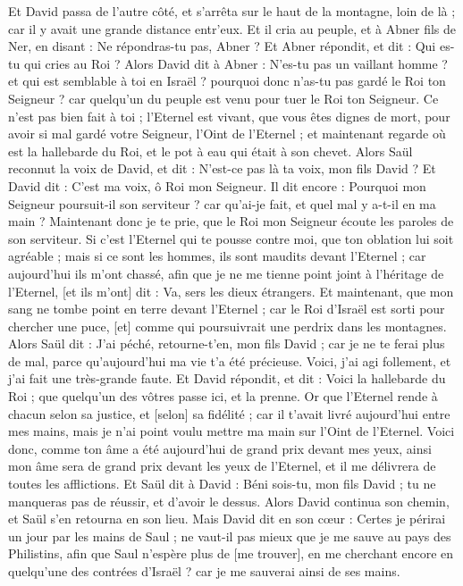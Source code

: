 \begin{multicols}{2}
Et David passa de l'autre côté, et s'arrêta sur le haut de la montagne, loin de là ; car il y avait une grande distance entr'eux.
Et il cria au peuple, et à Abner fils de Ner, en disant : Ne répondras-tu pas, Abner ? Et Abner répondit, et dit : Qui es-tu qui cries au Roi ?
Alors David dit à Abner : N'es-tu pas un vaillant homme ? et qui est semblable à toi en Israël ? pourquoi donc n'as-tu pas gardé le Roi ton Seigneur ? car quelqu'un du peuple est venu pour tuer le Roi ton Seigneur.
Ce n'est pas bien fait à toi ; l'Eternel est vivant, que vous êtes dignes de mort, pour avoir si mal gardé votre Seigneur, l'Oint de l'Eternel ; et maintenant regarde où est la hallebarde du Roi, et le pot à eau qui était à son chevet.
Alors Saül reconnut la voix de David, et dit : N'est-ce pas là ta voix, mon fils David ? Et David dit : C'est ma voix, ô Roi mon Seigneur.
Il dit encore : Pourquoi mon Seigneur poursuit-il son serviteur ? car qu'ai-je fait, et quel mal y a-t-il en ma main ?
Maintenant donc je te prie, que le Roi mon Seigneur écoute les paroles de son serviteur. Si c'est l'Eternel qui te pousse contre moi, que ton oblation lui soit agréable ; mais si ce sont les hommes, ils sont maudits devant l'Eternel ; car aujourd'hui ils m'ont chassé, afin que je ne me tienne point joint à l'héritage de l'Eternel, [et ils m'ont] dit : Va, sers les dieux étrangers.
Et maintenant, que mon sang ne tombe point en terre devant l'Eternel ; car le Roi d'Israël est sorti pour chercher une puce, [et] comme qui poursuivrait une perdrix dans les montagnes.
Alors Saül dit : J'ai péché, retourne-t'en, mon fils David ; car je ne te ferai plus de mal, parce qu'aujourd'hui ma vie t'a été précieuse. Voici, j'ai agi follement, et j'ai fait une très-grande faute.
Et David répondit, et dit : Voici la hallebarde du Roi ; que quelqu'un des vôtres passe ici, et la prenne.
Or que l'Eternel rende à chacun selon sa justice, et [selon] sa fidélité ; car il t'avait livré aujourd'hui entre mes mains, mais je n'ai point voulu mettre ma main sur l'Oint de l'Eternel.
Voici donc, comme ton âme a été aujourd'hui de grand prix devant mes yeux, ainsi mon âme sera de grand prix devant les yeux de l'Eternel, et il me délivrera de toutes les afflictions.
Et Saül dit à David : Béni sois-tu, mon fils David ; tu ne manqueras pas de réussir, et d'avoir le dessus. Alors David continua son chemin, et Saül s'en retourna en son lieu.
\VerseOne{}Mais David dit en son cœur : Certes je périrai un jour par les mains de Saul ; ne vaut-il pas mieux que je me sauve au pays des Philistins, afin que Saul n'espère plus de [me trouver], en me cherchant encore en quelqu'une des contrées d'Israël ? car je me sauverai ainsi de ses mains.

\end{multicols}
